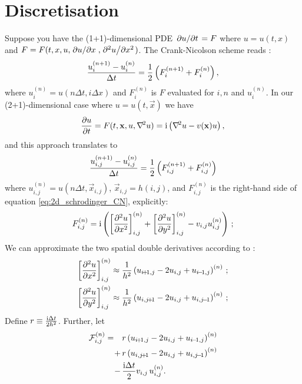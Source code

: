 
\newpage
\appendix

\section{Discretisation}\label{app:discretisation}

Suppose you have the (1+1)-dimensional PDE $\pdv*{u}{t}=F$ where $u=u(t,x)$ and $F = F(t, x, u, \pdv*{u}{x}, \pdv*[2]{u}{x})$. 
The Crank-Nicolson scheme reads \citep{Crank-Nicolson}: 
\begin{equation}\label{eq:general_CN}
    \frac{u_i^{(n+1)}- u_{i}^{(n)} }{\Delta t} = \frac{1}{2} \left( F_i^{(n+1)}+F_i^{(n)} \right),
\end{equation}
where $u_i^{(n)} = u(n\Delta t, i\Delta x)$ and $F_i^{(n)}$ is $F$ evaluated for $i, n$ and $u_i^{(n)}$. In our (2+1)-dimensional case where $u= u(t, \vec{x})$ we have
\begin{align}\label{eq:2d_schrodinger_CN}
    \pdv{u}{t} = F(t, \mathbf{x}, u, \nabla^{\! 2}u)= \mathrm{i} \left( \nabla^{\! 2} u - v(\mathbf{x}) u \right),
\end{align}
and this approach translates to 
\begin{equation}\label{eq:2d_CN}
    \frac{u_{i,j}^{(n+1)}-u_{i,j}^{(n)}}{\Delta t} = \frac{1}{2} \left( F_{i,j}^{(n+1)} + F_{i,j}^{(n)} \right) 
\end{equation}
where $u_{i,j}^{(n)} = u(n\Delta t, \vec{x}_{i,j})$, $\vec{x}_{i,j}=h(i,j)$, and $F_{i,j}^{(n)}$ is the right-hand side of equation \eqref{eq:2d_schrodinger_CN}, explicitly:
\begin{equation}
    F_{i, j}^{(n)} = \mathrm{i} \left(   \left[ \pdv[2]{u}{x} \right]_{i,j}^{(n)} + \left[ \pdv[2]{u}{y} \right]_{i,j}^{(n)} - v_{i,j}u_{i,j}^{(n)} \right) \, ;
\end{equation} 
We can approximate the two spatial double derivatives  according to :
\begin{subequations}
    \begin{align}
        \bracket{\pdv[2]{u}{x}}_{i,j}^{(n)} \approx \frac{1}{h^2} \closed{u_{i\!+\!1, j}-2u_{i,j} + u_{i\!-\!1, j}}^{(n)}\, ;\\
        \bracket{\pdv[2]{u}{y}}_{i,j}^{(n)} \approx \frac{1}{h^2} \closed{u_{i, j\!+\!1}-2u_{i,j} + u_{i, j\!-\!1}}^{(n)}\, ;
    \end{align}
\end{subequations}
Define $r\equiv \frac{\mathrm{i} \Delta t}{2h^2}$. Further, let
\begin{equation}
    \begin{split}
    \mathcal{F}_{i,j}^{(n)} = \quad&r\closed{ u_{i\!+\!1, j}-2u_{i,j} + u_{i\!-\!1, j}}^{(n)}  \\
    +\,&  r\closed{u_{i,j\!+\!1}-2u_{i,j} + u_{i,j\!-\!1}}^{(n)}\\ 
    -\,& \frac{\im \Delta t}{2} v_{i,j}\,u_{i,j}^{(n)}.
    \end{split}
\end{equation}
